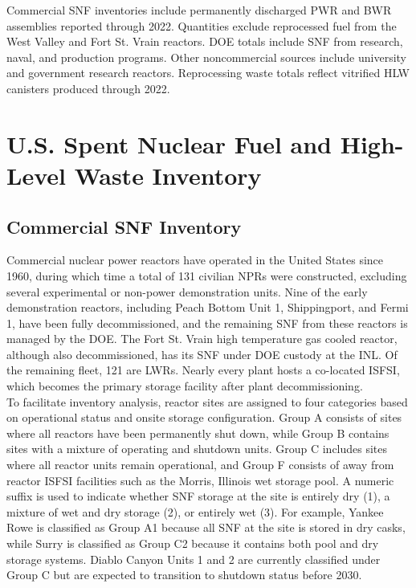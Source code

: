     Commercial \gls{SNF} inventories include permanently discharged \gls{PWR} and \gls{BWR} assemblies reported through 2022. Quantities exclude reprocessed fuel from the West Valley and Fort St. Vrain reactors.
    \gls{DOE} totals include \gls{SNF} from research, naval, and production programs.
    Other noncommercial sources include university and government research reactors.
    Reprocessing waste totals reflect vitrified \gls{HLW} canisters produced through 2022.


\section{U.S. Spent Nuclear Fuel and High-Level Waste Inventory}
\subsection{Commercial \gls{SNF} Inventory} 


 Commercial nuclear power reactors have operated in the United States since 1960, during which time a total of
 131 civilian \glspl{NPR} were constructed, excluding several experimental or non-power demonstration units.
 Nine of the early demonstration reactors, including Peach Bottom Unit 1, Shippingport, and Fermi 1, have been fully decommissioned,
 and the remaining \gls{SNF} from these reactors is managed by the \gls{DOE}. The Fort St.
 Vrain high temperature gas cooled reactor, although also decommissioned, has its \gls{SNF} under \gls{DOE} custody at
 the \gls{INL}. Of the remaining fleet, 121 are \glspl{LWR}. Nearly every plant hosts a co-located \gls{ISFSI}, which becomes the primary
 storage facility after plant decommissioning.\\

    To facilitate inventory analysis, reactor sites are assigned to four categories based on operational status and onsite
    storage configuration. Group A consists of sites where all reactors have been permanently shut down, while Group B
    contains sites with a mixture of operating and shutdown units. Group C includes sites where all reactor units remain
    operational, and Group F consists of away from reactor \gls{ISFSI} facilities such as the Morris, Illinois wet storage pool.
    A numeric suffix is used to indicate whether \gls{SNF} storage at the site is entirely dry (1), a mixture of wet and dry storage (2),
    or entirely wet (3). For example, Yankee Rowe is classified as Group A1 because all \gls{SNF} at the site is stored in dry casks,
    while Surry is classified as Group C2 because it contains both pool and dry storage systems. Diablo Canyon Units 1 and 2 are
    currently classified under Group C but are expected to transition to shutdown status before 2030.\\

